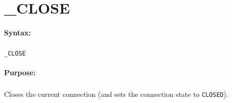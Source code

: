 
\newpage
\section{\_CLOSE}
\label{cmd:_CLOSE}

\paragraph{Syntax:}
\subparagraph{}
\texttt{\_CLOSE}

\paragraph{Purpose:}
\subparagraph{}
Closes the current connection (and sets the connection 
state to \texttt{CLOSED}).